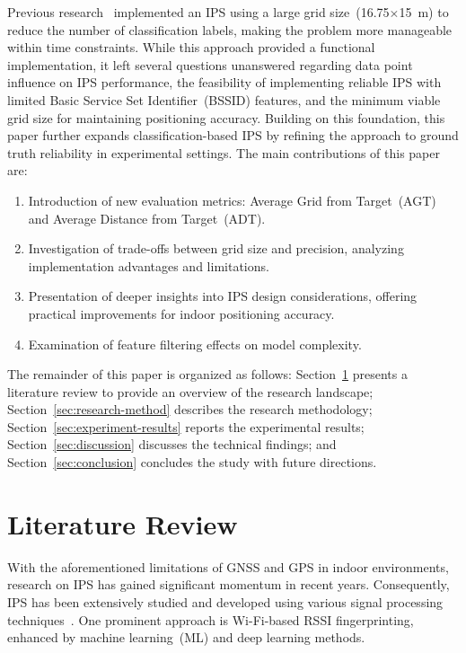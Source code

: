 \documentclass[runningheads]{llncs}
\begin{document}
Previous research~\cite{LRE1} implemented an IPS using a large grid size~(16.75$\times$15~m) to reduce the number of classification labels, making the problem more manageable within time constraints. While this approach provided a functional implementation, it left several questions unanswered regarding data point influence on IPS performance, the feasibility of implementing reliable IPS with limited Basic Service Set Identifier~(BSSID) features, and the minimum viable grid size for maintaining positioning accuracy. Building on this foundation, this paper further expands classification-based IPS by refining the approach to ground truth reliability in experimental settings. The main contributions of this paper are:
\begin{enumerate}
	\item Introduction of new evaluation metrics: Average Grid from Target~(AGT) and Average Distance from Target~(ADT).
	\item Investigation of trade-offs between grid size and precision, analyzing implementation advantages and limitations.
	\item Presentation of deeper insights into IPS design considerations, offering practical improvements for indoor positioning accuracy.
	\item Examination of feature filtering effects on model complexity.
\end{enumerate}
The remainder of this paper is organized as follows: Section~\ref{sec:literature-review} presents a literature review to provide an overview of the research landscape; Section~\ref{sec:research-method} describes the research methodology; Section~\ref{sec:experiment-results} reports the experimental results; Section~\ref{sec:discussion} discusses the technical findings; and Section~\ref{sec:conclusion} concludes the study with future directions.


\section{Literature Review}\label{sec:literature-review}

With the aforementioned limitations of GNSS and GPS in indoor environments, research on IPS has gained significant momentum in recent years. Consequently, IPS has been extensively studied and developed using various signal processing techniques~\cite{bgp4}. One prominent approach is Wi-Fi-based RSSI fingerprinting, enhanced by machine learning~(ML) and deep learning methods.
\end{document}
